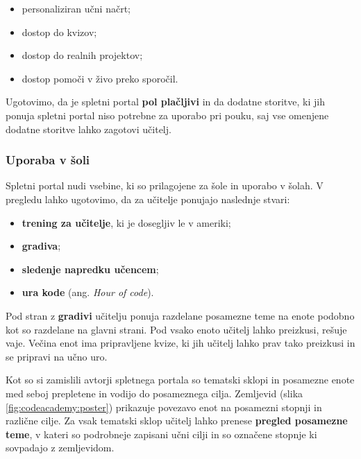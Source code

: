 \begin{itemize}
\item personaliziran učni načrt;
\item dostop do kvizov;
\item dostop do realnih projektov;
\item dostop pomoči v živo preko sporočil.
\end{itemize}

Ugotovimo, da je spletni portal \textbf{pol plačljivi} in da dodatne
storitve, ki jih ponuja spletni portal niso potrebne za uporabo pri
pouku, saj vse omenjene dodatne storitve lahko zagotovi učitelj.

\subsubsection{Uporaba v šoli}
\label{sec:uporaba_v_soli}

Spletni portal nudi vsebine, ki so prilagojene za šole in uporabo v
šolah. V pregledu lahko ugotovimo, da za učitelje ponujajo naslednje
stvari:

\begin{itemize}
\item \textbf{trening za učitelje}, ki je dosegljiv le v ameriki;
\item \textbf{gradiva};
\item \textbf{sledenje napredku učencem};
\item \textbf{ura kode} (ang. \emph{Hour of code}).
\end{itemize}

Pod stran z \textbf{ gradivi} %
učitelju ponuja razdelane posamezne teme na enote podobno kot so
razdelane na glavni strani. Pod vsako enoto učitelj lahko preizkusi,
rešuje vaje. Večina enot ima pripravljene kvize, ki jih učitelj lahko
prav tako preizkusi in se pripravi na učno uro.



Kot so si zamislili avtorji spletnega portala so tematski sklopi in
posamezne enote med seboj prepletene in vodijo do posameznega
cilja. Zemljevid (slika \ref{fig:codeacademy:poster}) prikazuje
povezavo enot na posamezni stopnji in različne cilje. Za vsak tematski
sklop učitelj lahko prenese \textbf{pregled posamezne teme}, v kateri
so podrobneje zapisani učni cilji in so označene stopnje ki sovpadajo
z zemljevidom.

